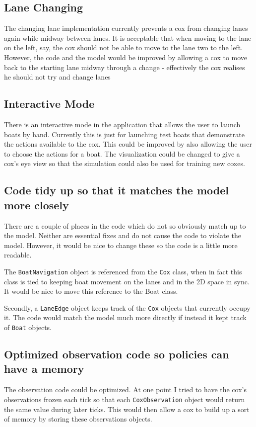 \subsection{Lane Changing}
The changing lane implementation currently prevents a cox from changing lanes again while midway between lanes. It is acceptable that when moving to the lane on the left, say, the cox should not be able to move to the lane two to the left. However, the code and the model would be improved by allowing a cox to move back to the starting lane midway through a change - effectively the cox realises he should not try and change lanes

\subsection{Interactive Mode}
There is an interactive mode in the application that allows the user to launch boats by hand. Currently this is just for launching test boats that demonstrate the actions available to the cox. This could be improved by also allowing the user to choose the actions for a boat. The visualization could be changed to give a cox's eye view so that the simulation could also be used for training new coxes.

\subsection{Code tidy up so that it matches the model more closely}
There are a couple of places in the code which do not so obviously match up to the model. Neither are essential fixes and do not cause the code to violate the model. However, it would be nice to change these so the code is a little more readable. 

The \texttt{BoatNavigation} object is referenced from the \texttt{Cox} class, when in fact this class is tied to keeping boat movement on the lanes and in the 2D space in sync. It would be nice to move this reference to the Boat class.

Secondly, a \texttt{LaneEdge} object keeps track of the \texttt{Cox} objects that currently occupy it. The code would match the model much more directly if instead it kept track of \texttt{Boat} objects.

\subsection{Optimized observation code so policies can have a memory}
The observation code could be optimized. At one point I tried to have the cox's observations frozen each tick so that each \texttt{CoxObservation} object would return the same value during later ticks. This would then allow a cox to build up a sort of memory by storing these observations objects.

